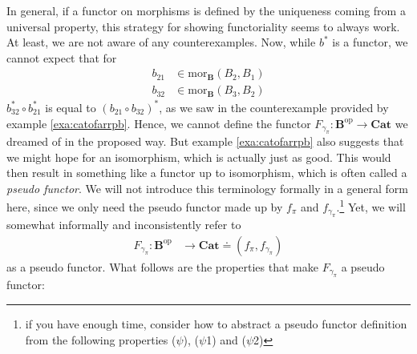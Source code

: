 In general, if a functor on morphisms is defined by the uniqueness coming from a universal property, this strategy for showing functoriality seems to always work.
At least, we are not aware of any counterexamples.
Now, while $b^{\ast}$ is a functor, we cannot expect that for
\begin{align*}
  b_{21}
  &\in
  \mathrm{mor}_{\mathbf{B}}(B_{2},B_{1})
  \\
  b_{32}
  &\in
  \mathrm{mor}_{\mathbf{B}}(B_{3},B_{2})
\end{align*}
$b_{32}^{\ast} \circ b_{21}^{\ast}$ is equal to $(b_{21} \circ b_{32})^{\ast}$, as we saw in the counterexample provided by example \ref{exa:catofarrpb}.
Hence, we cannot define the functor $F_{\gamma_{\pi}} \colon \mathbf{B}^{\mathrm{op}} \rightarrow \mathbf{Cat}$ we dreamed of in the proposed way.
But example \ref{exa:catofarrpb} also suggests that we might hope for an isomorphism, which is actually just as good.
This would then result in something like a functor up to isomorphism, which is often called a \textit{pseudo functor}.
We will not introduce this terminology formally in a general form here, since we only need the pseudo functor made up by $f_{\pi}$ and $f_{\gamma_{\pi}}$.\footnote{if you have enough time, consider how to abstract a pseudo functor definition from the following properties ($\psi$), ($\psi$1) and ($\psi$2)}
Yet, we will somewhat informally and inconsistently refer to
\begin{align*}
  F_{\gamma_{\pi}}
  \colon
  \mathbf{B}^{\mathrm{op}}
  &\rightarrow
  \mathbf{Cat}
  \doteq
  \left(
    f_{\pi},
    f_{\gamma_{\pi}}
  \right)
\end{align*}
as a pseudo functor.
What follows are the properties that make $F_{\gamma_{\pi}}$ a pseudo functor:
